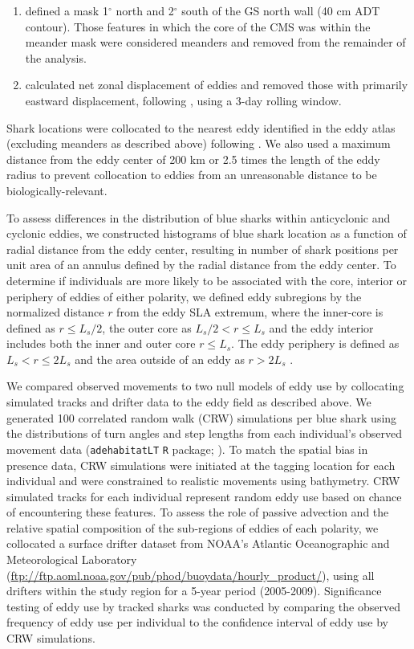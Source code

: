 \begin{enumerate} 
\item defined a mask 1$^\circ$ north and 2$^\circ$ south of the GS north wall (40 cm ADT contour). Those features in which the core of the CMS was within the meander mask were considered meanders and removed from the remainder of the analysis. 
\item calculated net zonal displacement of eddies and removed those with primarily eastward displacement, following \citet{Gaube2017DSR}, using a 3-day rolling window. 
\end{enumerate}

Shark locations were collocated to the nearest eddy identified in the eddy atlas (excluding meanders as described above) following \citet{Gaube2017}. We also used a maximum distance from the eddy center of 200 km or 2.5 times the length of the eddy radius to prevent collocation to eddies from an unreasonable distance to be biologically-relevant.

To assess differences in the distribution of blue sharks within anticyclonic and cyclonic eddies, we constructed histograms of blue shark location as a function of radial distance from the eddy center, resulting in number of shark positions per unit area of an annulus defined by the radial distance from the eddy center. To determine if individuals are more likely to be associated with the core, interior or periphery of eddies of either polarity, we defined eddy subregions by the normalized distance $r$ from the eddy SLA extremum, where the inner-core is defined as $r \leq L_s/2$, the outer core as $L_s/2 < r \leq L_s$ and the eddy interior includes both the inner and outer core $r \leq L_s$. The eddy periphery is defined as $L_s < r \leq 2L_s$ and the area outside of an eddy as $r > 2L_s$ \citep[see Fig. 2 in][]{Gaube2017}.

We compared observed movements to two null models of eddy use by collocating simulated tracks and drifter data to the eddy field as described above. We generated 100 correlated random walk (CRW) simulations per blue shark using the distributions of turn angles and step lengths from each individual's observed movement data (\texttt{adehabitatLT} \texttt{R} package; \citet{Calenge2006}). To match the spatial bias in presence data, CRW simulations were initiated at the tagging location for each individual and were constrained to realistic movements using bathymetry. CRW simulated tracks for each individual represent random eddy use based on chance of encountering these features. To assess the role of passive advection and the relative spatial composition of the sub-regions of eddies of each polarity, we collocated a surface drifter dataset from NOAA's Atlantic Oceanographic and Meteorological Laboratory (\url{ftp://ftp.aoml.noaa.gov/pub/phod/buoydata/hourly_product/}), using all drifters within the study region for a 5-year period (2005-2009). Significance testing of eddy use by tracked sharks was conducted by comparing the observed frequency of eddy use per individual to the confidence interval of eddy use by CRW simulations.

